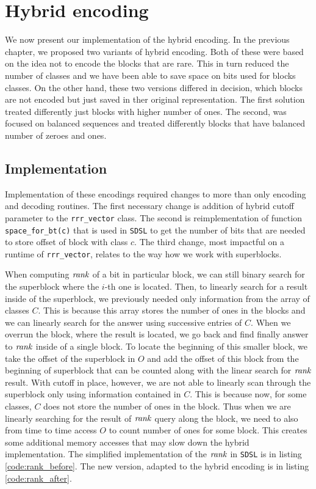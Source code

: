 \section{Hybrid encoding}

We now present our implementation of the hybrid encoding. In the previous chapter, we
proposed two variants of hybrid encoding. Both of these were based on the idea not to
encode the blocks that are rare. This in turn reduced the number of classes and we 
have been able to save space on bits used for blocks classes. On the other hand, these
two versions differed in decision, which blocks are not encoded but just saved in ther original
representation. The first solution treated differently just blocks with higher number of ones.
The second, was focused on balanced sequences and treated differently blocks that have balanced
number of zeroes and ones.

\subsection{Implementation}

Implementation of these encodings required changes to more than only encoding and decoding
routines. The first necessary change is addition of hybrid cutoff parameter
to the \texttt{rrr\_vector} class. The second is reimplementation of function
\texttt{space\_for\_bt(c)} that is used in \texttt{SDSL} to get the number of bits that are
needed to store offset of block with class $c$. The third change, most impactful on a runtime
of \texttt{rrr\_vector}, relates to the way how we work with superblocks.

When computing $\mathit{rank}$ of a bit in particular block, we can still binary search for
the superblock where the $i$-th one is located. Then, to linearly search for a result
inside of the superblock, we previously needed only information from the array of classes $C$.
This is because this array stores the number of ones in the blocks and we can linearly
search for the answer using successive entries of $C$. When we overrun the block, where
the result is located, we go back and find finally answer to $\mathit{rank}$ inside of a single
block. To locate the beginning of this smaller block, we take the offset of the superblock
in $O$ and add the offset of this block from the beginning of superblock that can be
counted along with the linear search for $\mathit{rank}$ result. With cutoff in place, however,
we are not able to linearly scan through the superblock only using information contained
in $C$. This is because now, for some classes, $C$ does not store the number of ones in
the block. Thus when we are linearly searching for the result of $\mathit{rank}$ query along the
block, we need to also from time to time access $O$ to count number of ones for some block.
This creates some additional memory accesses that may slow down the hybrid implementation.
The simplified implementation of the $\mathit{rank}$ in \texttt{SDSL} is in listing \ref{code:rank_before}.
The new version, adapted to the hybrid encoding is in listing \ref{code:rank_after}.

